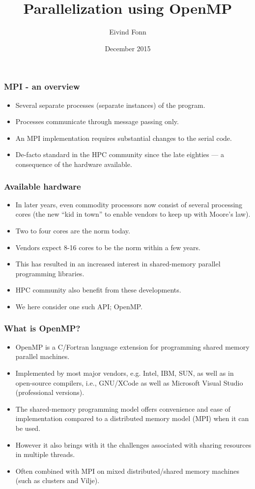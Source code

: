 


\title{Parallelization using OpenMP}
\author{Eivind Fonn}
\date{December 2015}
\maketitle

\begin{frame}
  \frametitle{MPI - an overview}
  \begin{itemize}
  \item Several separate processes (separate instances) of the program.
  \item Processes communicate through message passing only.
  \item An MPI implementation requires substantial changes to the serial code.
  \item De-facto standard in the HPC community since the late eighties --- a
    consequence of the hardware available.
  \end{itemize}
\end{frame}

\begin{frame}
  \frametitle{Available hardware}
  \begin{itemize}
  \item In later years, even commodity processors now consist of several
    processing cores (the new ``kid in town'' to enable vendors to keep up with
    Moore's law).
  \item Two to four cores are the norm today.
  \item Vendors expect 8-16 cores to be the norm within a few years.
  \item This has resulted in an increased interest in shared-memory parallel
    programming libraries.
  \item HPC community also benefit from these developments.
  \item We here consider one such API; OpenMP.
  \end{itemize}
\end{frame}

\begin{frame}
  \frametitle{What is OpenMP?}
  \begin{itemize}
  \item OpenMP is a C/Fortran language extension for programming shared memory
    parallel machines.
  \item Implemented by most major vendors, e.g. Intel, IBM, SUN, as well as in
    open-source compilers, i.e., GNU/XCode as well as Microsoft Visual Studio
    (professional versions).
  \item The shared-memory programming model offers convenience and ease of
    implementation compared to a distributed memory model (MPI) when it can be
    used.
  \item However it also brings with it the challenges associated with sharing
    resources in multiple threads.
  \item Often combined with MPI on mixed distributed/shared memory machines
    (such as clusters and Vilje).
  \end{itemize}
\end{frame}

